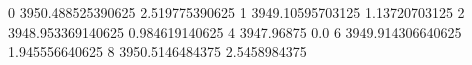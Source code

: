 0 3950.488525390625 2.519775390625
1 3949.10595703125 1.13720703125
2 3948.953369140625 0.984619140625
4 3947.96875 0.0
6 3949.914306640625 1.945556640625
8 3950.5146484375 2.5458984375
